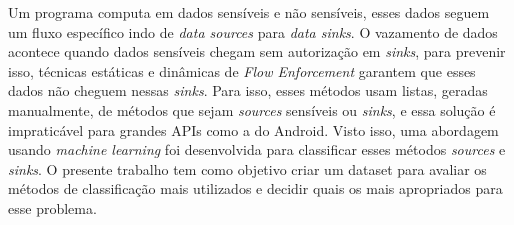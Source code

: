 Um programa computa em dados sensíveis e não sensíveis, esses dados seguem um fluxo específico indo de 
\textit{data sources} para \textit{data sinks}. O vazamento de dados acontece quando dados sensíveis chegam sem 
autorização em \textit{sinks}, para prevenir isso,  técnicas estáticas e dinâmicas de \textit{Flow Enforcement} 
garantem que esses dados não cheguem nessas \textit{sinks}. Para isso, esses métodos usam listas, geradas 
manualmente, de métodos que sejam \textit{sources} sensíveis ou \textit{sinks}, e essa solução é impraticável para 
grandes APIs como a do Android. Visto isso, uma abordagem usando \textit{machine learning} foi desenvolvida para 
classificar esses métodos \textit{sources} e \textit{sinks}. O presente trabalho tem como objetivo criar um dataset 
para avaliar os métodos de classificação mais utilizados e decidir quais os mais apropriados para esse problema.
